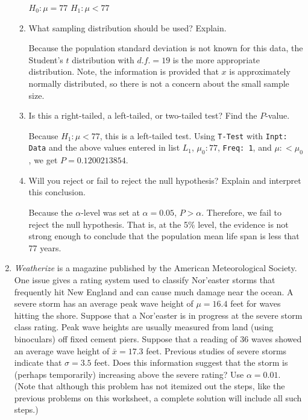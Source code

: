 \documentclass{article}
\newcommand{\answer}[1]{\color{white}#1}
\begin{document}
\begin{enumerate}
\begin{enumerate}
	{\answer $H_0 : \mu = 77$  
	$H_1: \mu < 77$}  
	
	\item What sampling distribution should be used? Explain.  
	
	{\answer Because the population standard deviation is not known for this data, the Student's $t$ distribution with $d.f.= 19$ is the more appropriate distribution. Note, the information is provided that $x$ is approximately normally distributed, so there is not a concern about the small sample size.}  
	
	\item Is this a right-tailed, a left-tailed, or two-tailed test? Find the $P$-value.  
	
	{\answer Because $H_1: \mu < 77$, this is a left-tailed test.  
	Using \texttt{T-Test} with \texttt{Inpt: Data} and the above values entered in list $L_1$, $\mu_0: 77$, \texttt{Freq: 1}, and $\mu: < \mu_0$, we get $P = 0.1200213854$.}  
	
	\item Will you reject or fail to reject the null hypothesis? Explain and interpret this conclusion.  
	
	{\answer Because the $\alpha$-level was set at $\alpha = 0.05$, $P > \alpha$. Therefore, we fail to reject the null hypothesis. That is, at the 5\% level, the evidence is not strong enough to conclude that the population mean life span is less that 77 years.}  
	
	\end{enumerate}

\vfill

\item {\em Weatherize} is a magazine published by the American Meteorological Society. One issue gives a rating system used to classify Nor'easter storms that frequently hit New England and can cause much damage near the ocean. A severe storm has an average peak wave height of $\mu = 16.4$ feet for waves hitting the shore. Suppose that a Nor'easter is in progress at the severe storm class rating. Peak wave heights are usually measured from land (using binoculars) off fixed cement piers. Suppose that a reading of 36 waves showed an average wave height of $\bar{x} = 17.3$ feet. Previous studies of severe storms indicate that $\sigma = 3.5$ feet. Does this information suggest that the storm is (perhaps temporarily) increasing above the severe rating? Use $\alpha = 0.01$.  
(Note that although this problem has not itemized out the steps, like the previous problems on this worksheet, a complete solution will include all such steps.)  


\end{enumerate}
\end{document}
